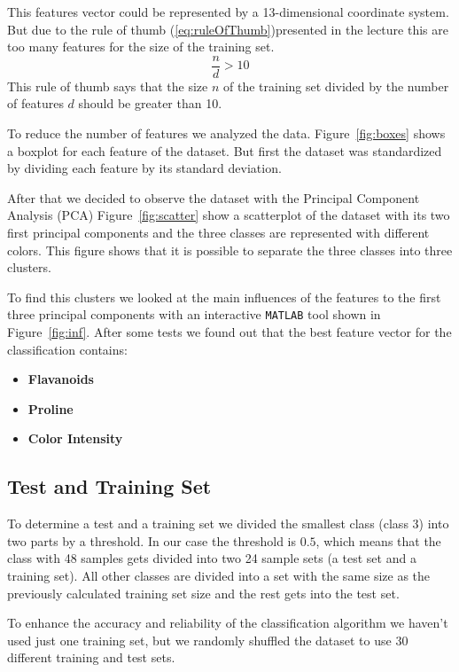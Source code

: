 \documentclass[a4paper,psfig,subfigure,epsfig,fleqn,amssmb,float,caption,fontenc,ausarbeitung]{article}
\begin{document}
This features vector could be represented by a 13-dimensional coordinate 
system. But due to the rule of thumb (\ref{eq:ruleOfThumb})presented in the 
lecture this are too many features for the size of the training set.
\begin{equation}
\label{eq:ruleOfThumb}
	\frac{n}{d} > 10
\end{equation}
This rule of thumb says that the size $n$ of the training set divided by the 
number of features $d$ should be greater than 10.

To reduce the number of features we analyzed the data. Figure~\ref{fig:boxes} 
shows a boxplot for each feature of the dataset. But first the dataset was 
standardized by dividing each feature by its standard deviation.

After that we decided to observe the dataset with the Principal Component 
Analysis (PCA) Figure~\ref{fig:scatter} show a scatterplot of the dataset 
with its two first principal components and the three classes are represented 
with different colors. This figure shows that it is possible to separate the 
three classes into three clusters. 

To find this clusters we looked at the main influences of the features to the 
first three principal components with an interactive \texttt{MATLAB} tool 
shown in Figure~\ref{fig:inf}. After some tests we found out that the best feature vector for the classification contains:

\begin{itemize}
	\item \textbf{Flavanoids}
	\item \textbf{Proline}
	\item \textbf{Color Intensity}
\end{itemize}


\subsection{Test and Training Set}
\label{sec:kNNtestset}

To determine a test and a training set we divided the smallest class (class 3)
 into two parts by a threshold. In our case the threshold is $0.5$, which 
means that the class with 48 samples gets divided into two 24 sample sets (a 
test set and a training set). All other classes are divided into a set with 
the same size as the previously calculated training set size and the rest 
gets into the test set.

To enhance the accuracy and reliability of the classification algorithm we 
haven't used just one training set, but we randomly shuffled the dataset to 
use 30 different training and test sets.
\end{document}
